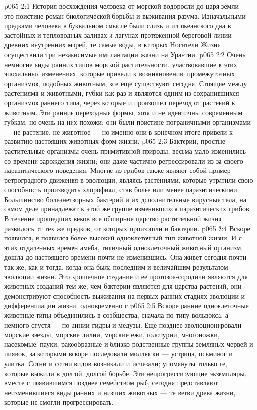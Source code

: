 \vs p065 2:1 История восхождения человека от морской водоросли до царя земли --- это поистине роман биологической борьбы и выживания разума. Изначальными предками человека в буквальном смысле были слизь и ил океанского дна в застойных и тепловодных заливах и лагунах протяженной береговой линии древних внутренних морей, те самые воды, в которых Носители Жизни осуществили три независимые имплантации жизни на Урантии.
\vs p065 2:2 Очень немногие виды ранних типов морской растительности, участвовавшие в этих эпохальных изменениях, которые привели к возникновению промежуточных организмов, подобных животным, все еще существуют сегодня. Стоящие между растениями и животными, губки как раз и являются одним из сохранившихся организмов раннего типа, через которые и произошел  переход от растений к животным. Эти ранние переходные формы, хотя и не идентичны современным губкам, но очень на них похожи; они были поистине пограничными организмами --- не растение, не животное --- но именно они в конечном итоге привели к развитию настоящих животных форм жизни.
\vs p065 2:3 Бактерии, простые растительные организмы очень примитивной природы, весьма мало изменились со времени зарождения жизни; они даже частично регрессировали из\hyp{}за своего паразитического поведения. Многие из грибов также являют собой пример ретроградного движения в эволюции, являясь растениями, которые утратили свою способность производить хлорофилл, став более или менее паразитическими. Большинство болезнетворных бактерий и их дополнительные вирусные тела, на самом деле принадлежат к этой же группе изменившихся паразитических грибов. В течение прошедших веков все обширное царство растительной жизни развилось от тех же предков, от которых произошли и бактерии.
\vs p065 2:4 Вскоре появился, и появился  более высокий одноклеточный тип животной жизни. И с этих отдаленных времен амеба, типичный одноклеточный животный организм, дошла до настоящего времени почти не изменившись. Она живет сегодня почти так же, как и тогда, когда она была последним и величайшим результатом эволюции жизни. Это крошечное создание и ее протозоа\hyp{}сородичи являются для животных созданий тем же, чем бактерии являются для царства растений, они демонстрируют способность выживания на первых ранних стадиях эволюции и дифференциации жизни, одновременно с 
\vs p065 2:5 Вскоре ранние одноклеточные животные типы объединились в сообщества, сначала по типу вольвокса, а немного спустя --- по линии гидры и медузы. Еще позднее эволюционировали морские звезды, морские лилии, морские ежи, голотурии, многоножки, насекомые, пауки, ракообразные и близко родственные группы земляных червей и пиявок, за которыми вскоре последовали моллюски --- устрица, осьминог и улитка. Сотни и сотни видов возникали и исчезали; упомянуты только те, которые выжили в долгой, долгой борьбе. Эти непрогрессирующие экземпляры, вместе с появившимся позднее семейством рыб, сегодня представляют неизменившиеся виды ранних и низших животных --- те ветви древа жизни, которые не смогли прогрессировать.
